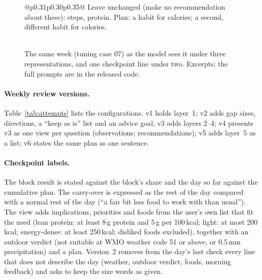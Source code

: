 \documentclass[10pt,twocolumn]{article}
\begin{document}
\begin{figure}[t]
\begin{tabular}{@{}p{}p{}p{}@{}}
Leave unchanged (make no recommendation about these): steps, protein.\newline
Plan: a habit for calories; a second, different habit for calories.\\
\midrule
{}\\
\bottomrule
\end{tabular}
\caption{The same week (tuning case 07) as the model sees it under three representations, and one checkpoint line
under two. Excerpts; the full prompts are in the released code.}
\label{fig:example}
\end{figure}

\paragraph{Weekly review versions.} Table~\ref{tab:attempts} lists the configurations. v1 holds layer~1; v2 adds gap
sizes, directions, a ``keep as is'' list and an advice goal; v3 adds layers 2--4; v4 presents v3 as one view per
question (observations; recommendations); v5 adds layer~5 as a list; v6 states the same plan as one sentence.

\paragraph{Checkpoint labels.} The block result is stated against the block's share and the day so far against the
cumulative plan. The carry-over is expressed as the rest of the day compared with a normal rest of the day (``a fair bit
less food to work with than usual''). The view adds implications, priorities and foods from the user's own list that
fit the need (lean protein: at least 8\,g protein and 5\,g per 100\,kcal; light: at most 200\,kcal; energy-dense: at
least 250\,kcal; disliked foods excluded), together with an outdoor verdict (not suitable at WMO weather code 51 or
above, or 0.5\,mm precipitation) and a plan. Version~2 removes from the day's last check every line that does not
describe the day (weather, outdoor verdict, foods, morning feedback) and asks to keep the size words as given.
\end{document}
